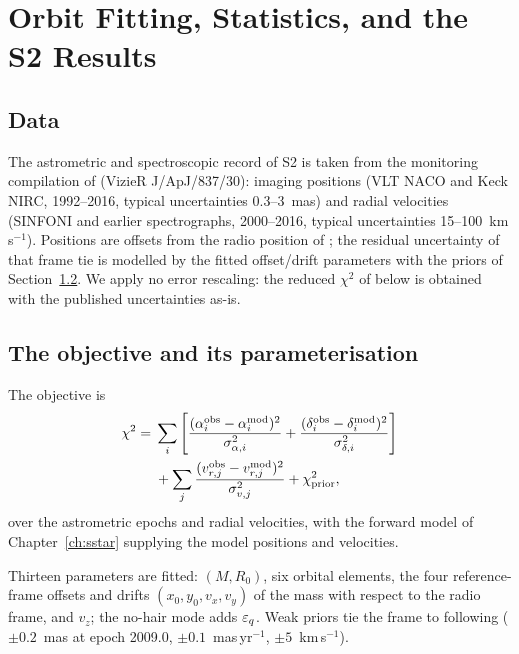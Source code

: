 \chapter{Orbit Fitting, Statistics, and the S2 Results}
\label{ch:fitting}

\section{Data}
\label{sec:data}

The astrometric and spectroscopic record of S2 is taken from the
monitoring compilation of \citet{Gillessen2017} (VizieR
J/ApJ/837/30): \FitNAst{} imaging positions (VLT NACO and Keck NIRC,
1992--2016, typical uncertainties 0.3--3~mas) and \FitNRv{} radial
velocities (SINFONI and earlier spectrographs, 2000--2016, typical
uncertainties 15--100~km\,s$^{-1}$). Positions are offsets from the radio
position of \sgra{}; the residual uncertainty of that frame tie is
modelled by the fitted offset/drift parameters with the
\citet{Plewa2015} priors of Section~\ref{sec:fitter}. We apply no error
rescaling: the reduced $\chi^2$ of \FitChiRed{} below is obtained with
the published uncertainties as-is.

\section{The objective and its parameterisation}
\label{sec:fitter}

The objective is
\begin{align}
\chi^2 ={}& \sum_i \left[
  \frac{(\alpha_i^{\rm obs}-\alpha_i^{\rm mod})^2}{\sigma_{\alpha,i}^2}
 +\frac{(\delta_i^{\rm obs}-\delta_i^{\rm mod})^2}{\sigma_{\delta,i}^2}
 \right]
 \nonumber\\
 &{}+ \sum_j
  \frac{(v_{r,j}^{\rm obs}-v_{r,j}^{\rm mod})^2}{\sigma_{v,j}^2}
 + \chi^2_{\rm prior},
\label{eq:chi2}
\end{align}
over the \FitNAst{} astrometric epochs and \FitNRv{} radial velocities,
with the forward model of Chapter~\ref{ch:sstar} supplying the model
positions and velocities.

Thirteen parameters are fitted: $(M, R_0)$, six orbital elements, the four
reference-frame offsets and drifts $(x_0, y_0, v_x, v_y)$ of the mass with
respect to the radio frame, and $v_{z}$; the no-hair mode adds $\varepsilon_q$.
Weak priors tie the frame to \sgra{} following \citet{Plewa2015}
($\pm0.2$~mas at epoch 2009.0, $\pm0.1$~mas\,yr$^{-1}$,
$\pm5$~km\,s$^{-1}$).

